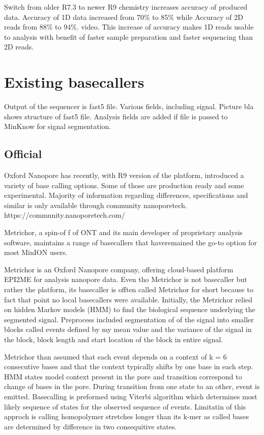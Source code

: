 \documentclass[times, utf8, diplomski, numeric, english]{fer}
\begin{document}
Switch from older R7.3 to newer R9 chemistry increases  accuracy of produced data. Accuracy of 1D data increased from 70\% to 85\% while Accuracy of 2D reads from 88\% to 94\%. video. This increase of accuracy makes 1D reads usable to analysis with benefit of faster sample preparation and faster sequencing than 2D reads.


  
\section{Existing basecallers}

Output of the sequencer is fast5 file. Various fields, including signal.
Picture bla shows structure of fast5 file. Analysis fields are added if file is passed to MinKnow for signal segmentation.



\subsection{Official}
Oxford Nanopore  has recently, with R9 version of the platform, introduced a variety of base calling
options. Some of those are production ready and some experimental. Majority of information regarding differences, specifications and similar is only available through community nanoporetech. 
https://community.nanoporetech.com/

Metrichor, a spin-of f of ONT and its main developer of proprietary analysis software, maintains a range of basecallers that haveremained the go-to option for most MinION users. 

Metrichor is an Oxford Nanopore company, offering cloud-based platform EPI2ME for analysis nanopore data. 
Even tho Metrichor is not basecaller but rather the platform, its basecaller is offten called Metrichor for short because to fact that point no local basecallers were available.
Initially, the Metrichor  relied on hidden Markov models (HMM) to find the biological sequence underlying the segmented signal.
Preprocess included segmentation of of the signal into smaller blocks called events defined by my mean value and the variance of the signal in the block, block length and start location of the block in entire signal.

Metrichor than assumed that each event depends on a context of k = 6 consecutive bases and that the context typically shifts by one base in each step. HMM states model context present in the pore and transition correspond to change of bases in the pore. During transition from one state to an other, event is emitted. Basecalling is preformed using Viterbi algorithm which determines most likely sequence of states for the observed sequence of events. Limitatin of this approch is calling homopolymer stretches longer than its k-mer as called bases are determined by difference in two consequitive states.
 
\end{document}
